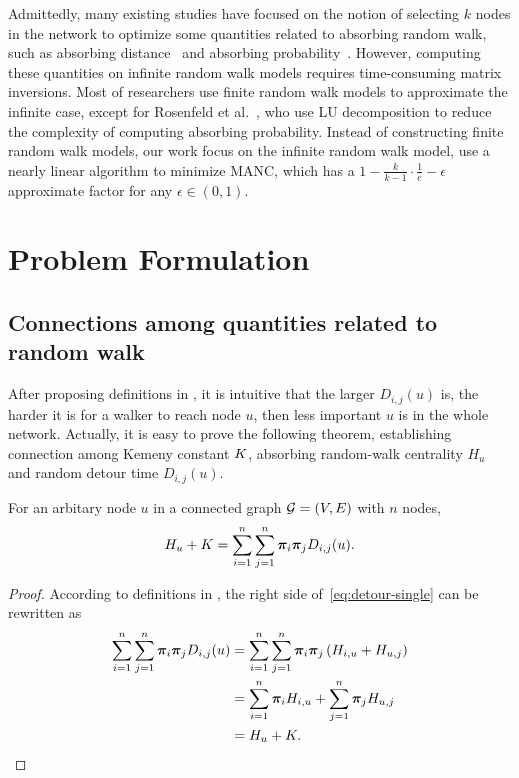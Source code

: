 \documentclass[sigconf]{acmart}
\begin{document}
Admittedly, many existing studies have focused on the notion of selecting \(k\) nodes in the network to optimize some quantities related to absorbing random walk, such as absorbing distance~\cite{LiYuHuCh14,MoBaZhPe20,ZhLuWaGu17} and absorbing probability~\cite{ZhLuWaGu17,RoGl16}.
However, computing these quantities on infinite random walk models requires time-consuming matrix inversions.
Most of researchers use finite random walk models to approximate the infinite case, except for Rosenfeld et al.~\cite{RoGl16}, who use LU decomposition to reduce the complexity of computing absorbing probability.
Instead of constructing finite random walk models, our work focus on the infinite random walk model, use a nearly linear algorithm to minimize MANC, which has a \(1-\frac{k}{k-1}\cdot\frac{1}{e}-\epsilon\) approximate factor for any \(\epsilon\in(0,1)\).

\section{Problem Formulation}\label{sec:prob-form}

\subsection{Connections among quantities related to random walk}

After proposing definitions in , it is intuitive that the larger \(D_{i,j}(u)\) is, the harder it is for a walker to reach node \(u\), then less important \(u\) is in the whole network.
Actually, it is easy to prove the following theorem, establishing connection among Kemeny constant \(K\), absorbing random-walk centrality \(H_u\) and random detour time \(D_{i,j}(u)\).
\begin{theorem}\label{thm:connection-single}
    For an arbitary node \(u\) in a connected graph \(\mathcal{G}=(V,E)\) with \(n\) nodes,
    \begin{equation}\label{eq:detour-single}
        H_u+K=\sum_{i=1}^n\sum_{j=1}^n\boldsymbol{\pi}_i\boldsymbol{\pi}_jD_{i,j}(u).
    \end{equation}
\end{theorem}
\begin{proof}
    According to definitions in , the right side of~\eqref{eq:detour-single} can be rewritten as
    \begin{align*}
        \sum_{i=1}^n\sum_{j=1}^n\boldsymbol{\pi}_i\boldsymbol{\pi}_jD_{i,j}(u) & =\sum_{i=1}^n\sum_{j=1}^n\boldsymbol{\pi}_i\boldsymbol{\pi}_j\left( H_{i,u}+H_{u,j} \right) \\
                                                           & =\sum_{i=1}^n\boldsymbol{\pi}_iH_{i,u}+\sum_{j=1}^n\boldsymbol{\pi}_jH_{u,j}         \\
                                                           & =H_u+K.
    \end{align*}
\end{proof}
\end{document}
